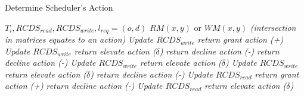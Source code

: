 \begin{algorithm}
\caption{Determine Scheduler's Action}
\label{alg:determine_sched_action}
\begin{algorithmic}[1]
\Require $T_{i}, RCDS_{read}, RCDS_{write}, l_{req} = (o,d)$
\Ensure $RM(x,y)$ or $WM(x,y)$ \textit{(intersection in matrices equates to an action)}
    \label{l1}
        \label{l2}
            \label{l3}
                \State \textit{Update $RCDS_{write}$} 
                \State \textit{return grant action (+)}\label{l4}
            \label{l5}
                \State \textit{Update $RCDS_{write}$} 
                \State \textit{return elevate action ($\delta$)}\label{l6}
            \Else
                \State \textit{return decline action (-)}\label{l7}
            \EndIf
        \Else
                \State \textit{return decline action (-)}
            \Else
                    \State \textit{Update $RCDS_{write}$} 
                    \State \textit{return elevate action ($\delta$)}
                    \State \textit{Update $RCDS_{write}$} 
                    \State \textit{return elevate action ($\delta$)}
                \Else
                    \State \textit{return decline action (-)}
                \EndIf
            \EndIf
        \EndIf
    \Else 
            \State \textit{Update $RCDS_{read}$}
            \State \textit{return grant action (+)}
        \Else 
                \State \textit{return decline action (-)}
            \Else
                \State \textit{Update $RCDS_{read}$} 
                \State \textit{return elevate action ($\delta$)}
            \EndIf
        \EndIf
    \EndIf
\EndFunction

\end{algorithmic}
\end{algorithm}